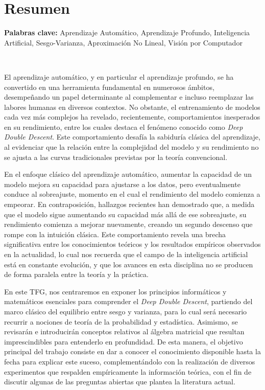 %

\chapter{Resumen}

\noindent\textbf{Palabras clave:} Aprendizaje Automático, Aprendizaje Profundo, Inteligencia Artificial, Sesgo-Varianza, Aproximación No Lineal, Visión por Computador

\

El aprendizaje automático, y en particular el aprendizaje profundo, se ha convertido en una herramienta fundamental en numerosos ámbitos, desempeñando un papel determinante al complementar e incluso reemplazar las labores humanas en diversos contextos. No obstante, el entrenamiento de modelos cada vez más complejos ha revelado, recientemente, comportamientos inesperados en su rendimiento, entre los cuales destaca el fenómeno conocido como \emph{Deep Double Descent}. Este comportamiento desafía la sabiduría clásica del aprendizaje, al evidenciar que la relación entre la complejidad del modelo y su rendimiento no se ajusta a las curvas tradicionales previstas por la teoría convencional.\newline

En el enfoque clásico del aprendizaje automático, aumentar la capacidad de un modelo mejora su capacidad para ajustarse a los datos, pero eventualmente conduce al sobreajuste, momento en el cual el rendimiento del modelo comienza a empeorar. En contraposición, hallazgos recientes han demostrado que, a medida que el modelo sigue aumentando su capacidad más allá de ese sobreajuste, su rendimiento comienza a mejorar nuevamente, creando un segundo descenso que rompe con la intuición clásica. Este comportamiento revela una brecha significativa entre los conocimientos teóricos y los resultados empíricos observados en la actualidad, lo cual nos recuerda que el campo de la inteligencia artificial está en constante evolución, y que los avances en esta disciplina no se producen de forma paralela entre la teoría y la práctica.\newline

En este TFG, nos centraremos en exponer los principios informáticos y matemáticos esenciales para comprender el \emph{Deep Double Descent}, partiendo del marco clásico del equilibrio entre sesgo y varianza, para lo cual será necesario recurrir a nociones de teoría de la probabilidad y estadística. Asimismo, se revisarán e introducirán conceptos relativos al álgebra matricial que resultan imprescindibles para entenderlo en profundidad. De esta manera, el objetivo principal del trabajo consiste en dar a conocer el conocimiento disponible hasta la fecha para explicar este suceso, complementándolo con la realización de diversos experimentos que respalden empíricamente la información teórica, con el fin de discutir algunas de las preguntas abiertas que plantea la literatura actual.\newline

